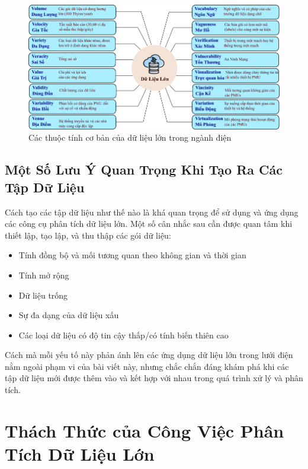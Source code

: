 \documentclass[utf8]{frontiersSCNS} %
\begin{document}
\FloatBarrier
\begin{figure}[h]
\centering
	\begin{center}
		\includegraphics[width=\textwidth]{big-data-properties-VN}%
	\end{center}
	\caption{Các thuộc tính cơ bản của dữ liệu lớn trong ngành điện}\label{fig:1}
\end{figure}
\FloatBarrier


\subsection{Một Số Lưu Ý Quan Trọng Khi Tạo Ra Các Tập Dữ Liệu}

Cách tạo các tập dữ liệu như thế nào là khá quan trọng để sử dụng và ứng dụng các công cụ phân tích dữ liệu lớn. Một số cân nhắc sau cần được quan tâm khi thiết lập, tạo lập, và thu thập các gói dữ liệu: 

\begin{itemize}
\item Tính đồng bộ và mối tương quan theo không gian và thời gian
\item Tính mở rộng
\item Dữ liệu trống
\item Sự đa dạng của dữ liệu xấu
\item Các loại dữ liệu có độ tin cậy thấp/có tính biến thiên cao
\end{itemize}

Cách mà mỗi yếu tố này phản ánh lên các ứng dụng dữ liệu lớn trong lưới điện nằm ngoài phạm vi của bài viết này, nhưng chắc chắn đáng khám phá khi các tập dữ liệu mới được thêm vào và kết hợp với nhau trong quá trình xử lý và phân tích.

\section{Thách Thức của Công Việc Phân Tích Dữ Liệu Lớn}
\end{document}
